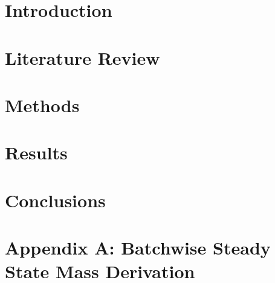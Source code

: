 \documentclass[edeposit,fullpage]{uiucthesis2018}
\begin{document}
\tableofcontents
\listoftables
\listoffigures


\pagebreak
\mainmatter

\chapter{Introduction}


\chapter{Literature Review}


\chapter{Methods}


\chapter{Results}


\chapter{Conclusions}


\chapter*{Appendix A: Batchwise Steady State Mass Derivation}


\backmatter



\end{document}
